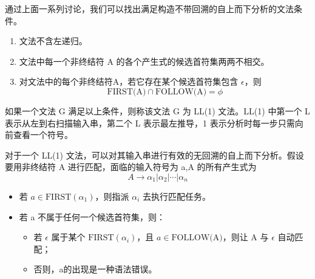 通过上面一系列讨论，我们可以找出满足构造不带回溯的自上而下分析的文法条件。
\begin{enumerate}
    \item 文法不含左递归。
    \item 文法中每一个非终结符 A 的各个产生式的候选首符集两两不相交。
    \item 对文法中的每个非终结符A，若它存在某个候选首符集包含 $\epsilon$，则
    \[ \text{FIRST(A)} \cap \text{FOLLOW(A)} = \phi \]
\end{enumerate}
如果一个文法 G 满足以上条件，则称该文法 G 为 LL(1) 文法。LL(1) 中第一个 L 表示从左到右扫描输入串，第二个 L 表示最左推导，1 表示分析时每一步只需向前查看一个符号。 

对于一个 LL(1) 文法，可以对其输入串进行有效的无回溯的自上而下分析。假设要用非终结符 A 进行匹配，面临的输入符号为 a,A 的所有产生式为
\[ A \rightarrow \alpha_1 | \alpha_2 | \cdots | \alpha_n \]
\begin{itemize}
    \item 若 $a\in \text{FIRST}(\alpha_1)$，则指派 $\alpha_i$ 去执行匹配任务。
    \item 若 a 不属于任何一个候选首符集，则：
    \begin{itemize}
        \item 若 $\epsilon$ 属于某个 $\text{FIRST}(\alpha_i)$，且 $a\in \text{FOLLOW(A)}$，则让 A 与 $\epsilon$ 自动匹配；
        \item 否则，a的出现是一种语法错误。
    \end{itemize}
\end{itemize}


\newpage